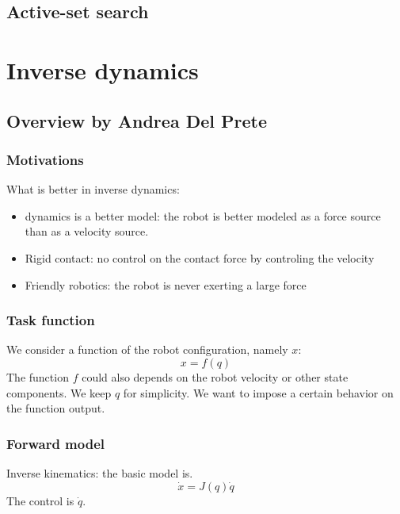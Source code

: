 \documentclass{book}
\begin{document}
\chapter{Active-set search}

\part{Inverse dynamics}

\chapter{Overview by Andrea Del Prete}

\section{Motivations}

What is better in inverse dynamics:
\begin{itemize}
\item  dynamics is a better model: the robot is better modeled as a force source than as a velocity source.
\item Rigid contact: no control on the contact force by controling the velocity
\item Friendly robotics: the robot is never exerting a large force 
\end{itemize}

\section{Task function}

We consider a function of the robot configuration, namely $x$:
$$ x = f(q) $$
The function $f$ could also depends on the robot velocity or other state components. We keep $q$ for simplicity. We want to impose a certain behavior on the function output. 

\section{Forward model}
Inverse kinematics: the basic model is.
$$ \dot x = J(q) \dot q$$
The control is $\dot q$.
\end{document}
